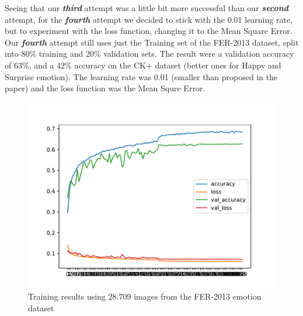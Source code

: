 \documentclass[runningheads,a4paper,11pt]{report}
\begin{document}
Seeing that our \textbf{\emph{third}} attempt was a little bit more successful than our \textbf{\emph{second}} attempt, for the \textbf{\emph{fourth}} attempt we decided to stick with the 0.01 learning rate, but to experiment with the loss function, changing it to the Mean Square Error. \\
Our \textbf{\emph{fourth}} attempt still uses just the Training set of the FER-2013 dataset, split into 80\% training and 20\% validation sets. The result were a validation accuracy of 63\%, and a 42\% accuracy on the CK+ dataset (better ones for Happy and Surprise emotion). The learning rate was 0.01 (smaller than proposed in the paper) and the loss function was the Mean Squre Error.
\begin{figure}[htbp]
\begin{center}
	\includegraphics[scale=0.8]{Fig/fer_training_28k_001_mean_square.pdf}
	\caption{Training results using 28.709 images from the FER-2013 emotion dataset}
	\label{fer_training_28k_001_mean_square}
\end{center}
\end{figure}
\end{document}
